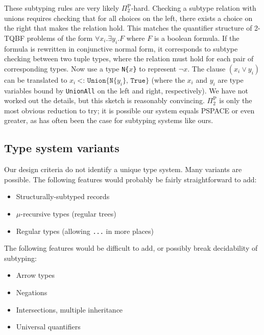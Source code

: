 
These subtyping rules are very likely $\Pi_2^{\textrm{P}}$-hard.
Checking a subtype relation with unions requires checking that for all choices
on the left, there exists a choice on the right that makes the relation hold.
This matches the quantifier structure of 2-TQBF problems of the form
$\forall x_i . \exists y_i . F$ where $F$ is a boolean formula. If the formula
is rewritten in conjunctive normal form, it corresponds to subtype checking
between two tuple types, where the relation must hold for each pair of
corresponding types. Now use a type \texttt{N\{}$x$\texttt{\}} to
represent $\neg x$. The clause $(x_i \vee y_i)$ can be translated to
$x_i\ \texttt{<:\ Union\{N\{}y_i\texttt{\}, True\}}$ (where the $x_i$ and
$y_i$ are type variables bound by \texttt{UnionAll} on the left and right,
respectively).
We have not worked out the details, but this sketch is reasonably
convincing. $\Pi_2^{\textrm{P}}$ is only the most obvious
reduction to try; it is possible our system equals PSPACE or even greater,
as has often been the case for subtyping systems like ours.


\subsection{Type system variants}

Our design criteria do not identify a unique type system.
Many variants are possible.
The following features would probably be fairly straightforward to add:

\vspace{-3ex}
\begin{singlespace}
\begin{itemize}
\item Structurally-subtyped records
\item $\mu$-recursive types (regular trees)
\item Regular types (allowing \texttt{...} in more places)
\end{itemize}
\end{singlespace}

\noindent
The following features would be difficult to add, or possibly break decidability
of subtyping:

\vspace{-3ex}
\begin{singlespace}
\begin{itemize}
\item Arrow types
\item Negations
\item Intersections, multiple inheritance
\item Universal quantifiers
\end{itemize}
\end{singlespace}


